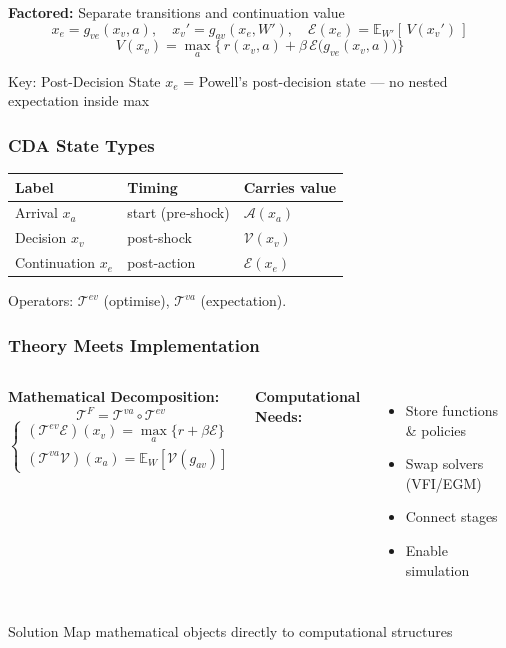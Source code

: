 \documentclass[10pt]{beamer}
\begin{document}
\begin{frame}
  \textbf{Factored:} Separate transitions and continuation value
  \[
    x_e=g_{ve}(x_v,a),\quad x_{v}'=g_{av}(x_e,W'), \quad \mathscr E(x_e)=\mathbb E_{W'}[\,V(x_{v}')\,]
  \]
  \[
    V(x_v)=\max_{a}\bigl\{\,r(x_v,a)+\beta\,\mathscr E\!\bigl(g_{ve}(x_v,a)\bigr)\bigr\}
  \]
  
\begin{block}{Key: Post-Decision State}
  $x_e$ = Powell's post-decision state — no nested expectation inside max
\end{block}
\end{frame}

\begin{frame}
  \frametitle{CDA State Types}
  \centering
  \begin{tabular}{lll}\hline
    \textbf{Label} & \textbf{Timing} & \textbf{Carries value} \\ \hline
    Arrival   $x_a$ & start (pre‑shock) & $\mathscr A(x_a)$ \\
    Decision  $x_v$ & post‑shock        & $\mathscr V(x_v)$ \\
    Continuation $x_e$ & post‑action   & $\mathscr E(x_e)$ \\ \hline
  \end{tabular}

  \vspace{0.8em}
  Operators: $\mathscr T^{ev}$ (optimise), $\mathscr T^{va}$ (expectation).
\end{frame}

\begin{frame}
  \frametitle{Theory Meets Implementation}
  \begin{columns}[T]
    \textbf{Mathematical Decomposition:}
    \[
      \boxed{\mathscr T^{F}= \mathscr T^{va}\circ \mathscr T^{ev}}
    \]
    \[
      \begin{cases}
        (\mathscr T^{ev}\mathscr E)(x_v)=\max_{a}\{r+\beta\mathscr E\}\\
        (\mathscr T^{va}\mathscr V)(x_a)=\mathbb E_W[\mathscr V(g_{av})]
      \end{cases}
    \]
    
    \textbf{Computational Needs:}
    \begin{itemize}
      \item Store functions \& policies
      \item Swap solvers (VFI/EGM)
      \item Connect stages
      \item Enable simulation
    \end{itemize}
  \end{columns}
  
  \vspace{0.5em}
  \begin{block}{Solution}
    Map mathematical objects directly to computational structures
  \end{block}
\end{frame}
\end{document}
